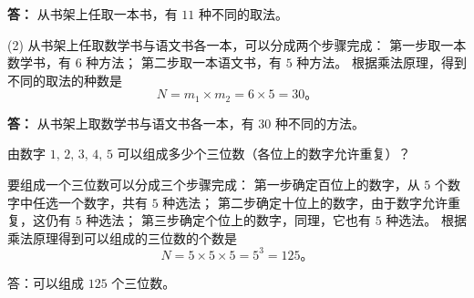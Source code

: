 \textbf{答：} 从书架上任取一本书，有 $11$ 种不同的取法。

(2) 从书架上任取数学书与语文书各一本，可以分成两个步骤完成：
第一步取一本数学书，有 $6$ 种方法；
第二步取一本语文书，有 $5$ 种方法。
根据乘法原理，得到不同的取法的种数是
$$ N = m_1 \times m_2 = 6 \times 5 = 30 \text{。} $$

\textbf{答：} 从书架上取数学书与语文书各一本，有 $30$ 种不同的方法。

\liti 由数字 $1,\, 2,\, 3,\, 4,\, 5$ 可以组成多少个三位数（各位上的数字允许重复）？

\jie 要组成一个三位数可以分成三个步骤完成：
第一步确定百位上的数字，从 $5$ 个数字中任选一个数字，共有 $5$ 种选法；
第二步确定十位上的数字，由于数字允许重复，这仍有 $5$ 种选法；
第三步确定个位上的数字，同理，它也有 $5$ 种选法。
根据乘法原理得到可以组成的三位数的个数是
$$ N = 5 \times 5 \times 5 = 5^3 = 125 \text{。} $$

答：可以组成 $125$ 个三位数。


